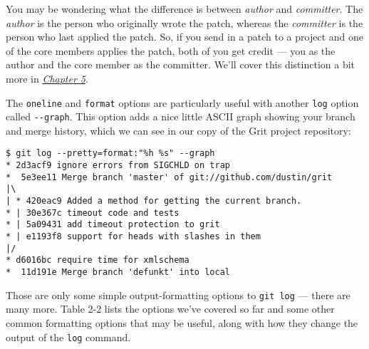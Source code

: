 \documentclass[a4paper]{book}
\newcommand{\prechap}{Chapter }
\newcommand{\postchap}{}
\newcommand{\chapref}[1]{\hyperref[chap:#1]{\prechap #1\postchap}}
\begin{document}
You may be wondering what the difference is between \emph{author} and \emph{committer}. The \emph{author} is the person who originally wrote the patch, whereas the \emph{committer} is the person who last applied the patch. So, if you send in a patch to a project and one of the core members applies the patch, both of you get credit --- you as the author and the core member as the committer. We'll cover this distinction a bit more in \emph{\chapref{5}}.

The \texttt{oneline} and \texttt{format} options are particularly useful with another \texttt{log} option called \texttt{-{}-graph}. This option adds a nice little ASCII graph showing your branch and merge history, which we can see in our copy of the Grit project repository:

\begin{shaded}\begin{verbatim}
$ git log --pretty=format:"%h %s" --graph
* 2d3acf9 ignore errors from SIGCHLD on trap
*  5e3ee11 Merge branch 'master' of git://github.com/dustin/grit
|\
| * 420eac9 Added a method for getting the current branch.
* | 30e367c timeout code and tests
* | 5a09431 add timeout protection to grit
* | e1193f8 support for heads with slashes in them
|/
* d6016bc require time for xmlschema
*  11d191e Merge branch 'defunkt' into local
\end{verbatim}\end{shaded}

Those are only some simple output-formatting options to \texttt{git log} --- there are many more. Table 2-2 lists the options we've covered so far and some other common formatting options that may be useful, along with how they change the output of the \texttt{log} command.
\end{document}
